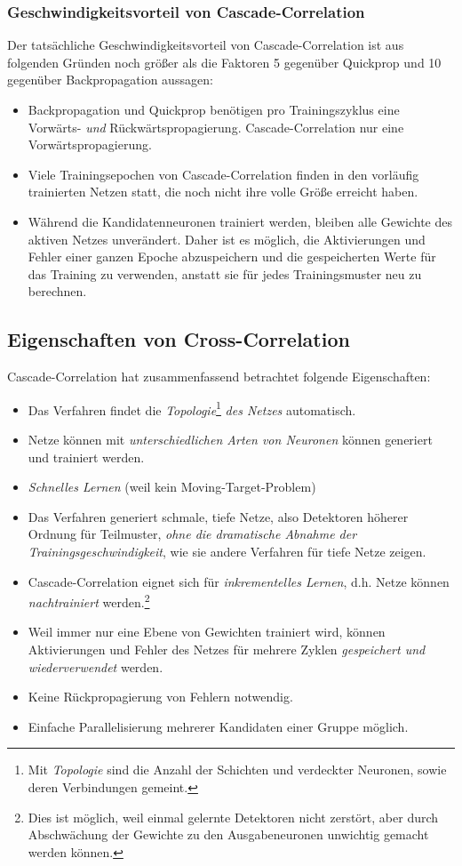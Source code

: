 \subsubsection*{Geschwindigkeitsvorteil von Cascade-Correlation}
Der tatsächliche Geschwindigkeitsvorteil von Cascade-Correlation ist aus folgenden Gründen noch größer als die Faktoren 5 gegenüber Quickprop und 10 gegenüber Backpropagation aussagen:

\begin{itemize}
	\item Backpropagation und Quickprop benötigen pro Trainingszyklus eine Vorwärts- \emph{und} Rückwärtspropagierung. Cascade-Correlation nur eine Vorwärtspropagierung.
	\item Viele Trainingsepochen von Cascade-Correlation finden in den vorläufig trainierten Netzen statt, die noch nicht ihre volle Größe erreicht haben.
	\item Während die Kandidatenneuronen trainiert werden, bleiben alle Gewichte des aktiven Netzes unverändert. Daher ist es möglich, die Aktivierungen und Fehler einer ganzen Epoche abzuspeichern und die gespeicherten Werte für das Training zu verwenden, anstatt sie für jedes Trainingsmuster neu zu berechnen.
\end{itemize}

\subsection*{Eigenschaften von Cross-Correlation}
Cascade-Correlation hat zusammenfassend betrachtet folgende Eigenschaften:

\begin{itemize}
	\item Das Verfahren findet die \emph{Topologie}\footnote{Mit \emph{Topologie} sind die Anzahl der Schichten und verdeckter Neuronen, sowie deren Verbindungen gemeint.} \emph{des Netzes} automatisch.
	\item Netze können mit \emph{unterschiedlichen Arten von Neuronen} können generiert und trainiert werden.
	\item \emph{Schnelles Lernen} (weil kein Moving-Target-Problem)
	\item Das Verfahren generiert schmale, tiefe Netze, also Detektoren höherer Ordnung für Teilmuster, \emph{ohne die dramatische Abnahme der Trainingsgeschwindigkeit}, wie sie andere Verfahren für tiefe Netze zeigen.
	\item Cascade-Correlation eignet sich für \emph{inkrementelles Lernen}, d.h. Netze können \emph{nachtrainiert} werden.\footnote{Dies ist möglich, weil einmal gelernte Detektoren nicht zerstört, aber durch Abschwächung der Gewichte zu den Ausgabeneuronen unwichtig gemacht werden können.}
	\item Weil immer nur eine Ebene von Gewichten trainiert wird, können Aktivierungen und Fehler des Netzes für mehrere Zyklen \emph{gespeichert und wiederverwendet} werden.
	\item Keine Rückpropagierung von Fehlern notwendig.
	\item Einfache Parallelisierung mehrerer Kandidaten einer Gruppe möglich.
\end{itemize}


